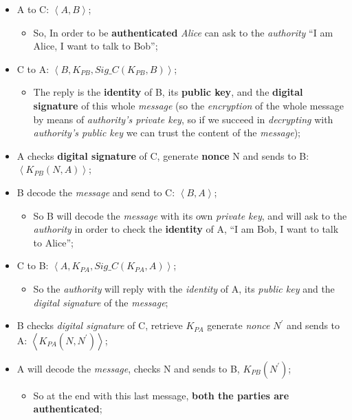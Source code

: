 \documentclass{article}
\begin{document}
\begin{itemize}
\item A to C: $\left \langle A, B \right \rangle$;
\begin{itemize}
\item So, In order to be \textbf{authenticated} \emph{Alice} can ask to the \emph{authority} “I am Alice, I want to talk to Bob”;
\end{itemize}
\item C to A: $\left \langle B, K_{PB}, Sig\_C(K_{PB},B) \right \rangle$;
\begin{itemize}
\item The reply is the \textbf{identity} of B, its \textbf{public key}, and the \textbf{digital signature} of this whole \emph{message} (so the \emph{encryption} of the whole message by means of \emph{authority’s private key}, so if we succeed in \emph{decrypting} with \emph{authority’s public key} we can trust the content of the \emph{message});
\end{itemize}
\item A checks \textbf{digital signature} of C, generate \textbf{nonce} N and sends to B: $\left \langle K_{PB}(N,A) \right \rangle$;
\item B decode the \emph{message} and send to C: $\left \langle B,A \right \rangle$;
\begin{itemize}
\item So B will decode the \emph{message} with its own \emph{private key}, and will ask to the \emph{authority} in order to check the \textbf{identity} of A, “I am Bob, I want to talk to Alice”;
\end{itemize}
\item C to B: $\left \langle A, K_{PA}, Sig\_C(K_{PA},A) \right \rangle$;
\begin{itemize}
\item So the \emph{authority} will reply with the \emph{identity} of A, its \emph{public key} and the \emph{digital signature} of the \emph{message};
\end{itemize}
\item B checks \emph{digital signature} of C, retrieve $K_{PA}$ generate \emph{nonce} $N^{'}$ and sends to A: $\left \langle K_{PA}(N,N^{'}) \right \rangle$;
\item A will decode the \emph{message}, checks N and sends to B, $K_{PB}(N^{'})$;
\begin{itemize}
\item So at the end with this last message, \textbf{both the parties are authenticated};
\end{itemize}
\end{itemize} 
\clearpage
\end{document}
